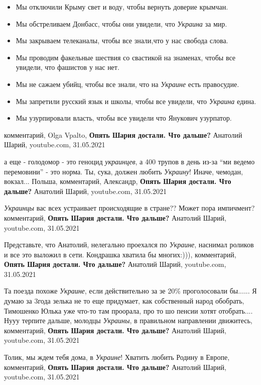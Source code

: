 \begin{itemize}
\item Мы отключили Крыму свет и воду, чтобы вернуть доверие крымчан. 
\item Мы обстреливаем Донбасс, чтобы они увидели, что \emph{Украина} за мир. 
\item Мы закрываем телеканалы, чтобы все знали,что у нас свобода слова. 
\item Мы проводим факельные шествия со свастикой на знаменах, чтобы все увидели, что фашистов у нас нет.
\item Мы не сажаем убийц, чтобы все знали, что на \emph{Украине} есть правосудие.
\item Мы запретили русский язык и школы, чтобы все увидели, что \emph{Украина} едина.
\item Мы узурпировали власть, чтобы все увидели что Янукович узурпатор.
\end{itemize}
комментарий,  Olga Vpalto, \textbf{Опять Шария достали. Что дальше?} Анатолий Шарий, youtube.com, 31.05.2021

а еще - голодомор - это геноцид \emph{украинцев}, а 400 трупов в день из-за \enquote{ми ведемо
перемовини} - это норма. Ты, сука, должен любить \emph{Украину}! Иначе, чемодан,
вокзал... Польша,
комментарий, Александр, \textbf{Опять Шария достали. Что дальше?} Анатолий Шарий, youtube.com, 31.05.2021

\emph{Украинцы} вас всех устраивает происходящие в стране?? Может пора импичмент?
комментарий, \textbf{Опять Шария достали. Что дальше?} Анатолий Шарий, youtube.com, 31.05.2021

Представьте, что Анатолий, нелегально проехался по \emph{Украине}, наснимал роликов и все это выложил в сети. Кондрашка хватила бы многих:))),
комментарий, \textbf{Опять Шария достали. Что дальше?} Анатолий Шарий, youtube.com, 31.05.2021

Та поезда похоже \emph{Украине}, если действительно за зе 20\% проголосовали бы...... Я
думаю за 3года зелька не то еще придумает, как собственный народ обобрать,
Тимошенко Юлька уже что-то там проорала, про то шо пенсии хотят отобрать....
Нууу терпите дальше, молодцы \emph{Украины}, в правильном направлении движитесь,
комментарий, \textbf{Опять Шария достали. Что дальше?} Анатолий Шарий, youtube.com, 31.05.2021

Толик, мы ждем тебя дома, в \emph{Украине}! Хватить любить Родину в Европе,
комментарий, \textbf{Опять Шария достали. Что дальше?} Анатолий Шарий, youtube.com, 31.05.2021

